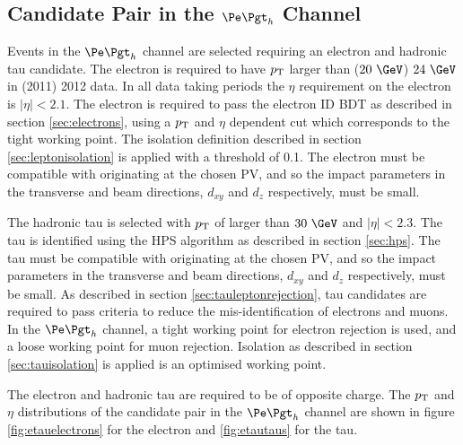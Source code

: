 \subsection{Candidate Pair in the $\etau$ Channel}

Events in the $\etau$ channel are selected requiring an electron and hadronic tau
candidate. The electron is required to have $p_{\mathrm{T}}$ larger than ($20~\GeV$)
$24~\GeV$ in (2011) 2012 data. In all data taking periods the $\eta$ requirement
on the electron is $|\eta| < 2.1$. The electron is required to pass the electron
ID \ac{BDT} as described in section \ref{sec:electrons}, using a $p_{\mathrm{T}}$ and
$\eta$ dependent cut which corresponds to the tight working point.  
The isolation definition described in section \ref{sec:leptonisolation} is
applied with a threshold of 0.1. The electron must be compatible with
originating at the chosen \ac{PV}, and so the impact parameters in the
transverse and beam directions, $d_{xy}$ and $d_{z}$ respectively, must be
small. 

The hadronic tau is selected with $p_{\mathrm{T}}$ of larger than $30~\GeV$ and
$|\eta|<2.3$. The tau is identified using the \ac{HPS} algorithm as described in 
section \ref{sec:hps}. The tau must be compatible with
originating at the chosen \ac{PV}, and so the impact parameters in the
transverse and beam directions, $d_{xy}$ and $d_{z}$ respectively, must be
small. As described in section \ref{sec:tauleptonrejection}, tau candidates are
required to pass criteria to reduce the mis-identification of electrons and
muons. In the $\etau$ channel, a tight working point for electron rejection is
used, and a loose working point for muon rejection. Isolation as described in
section \ref{sec:tauisolation} is applied is an optimised working point.  

The electron and hadronic tau are required to be of opposite charge. 
The $p_{\mathrm{T}}$ and $\eta$ distributions of the candidate pair in the
$\etau$ channel are shown in figure \ref{fig:etauelectrons} for the electron and
\ref{fig:etautaus} for the tau. 


